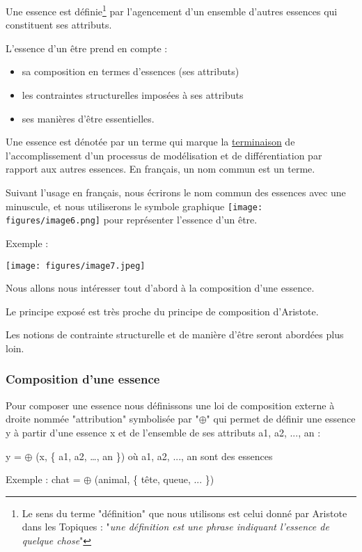 \documentclass[a4paper, 12pt, openright, french]{book}
\begin{document}
Une essence est définie\footnote{Le sens du terme "définition" que nous utilisons est
	celui donné par Aristote dans les Topiques : "\emph{une définition est
		une phrase indiquant l'essence de quelque chose}"} par l'agencement d'un ensemble
d'autres essences qui constituent ses attributs.

L'essence d'un être prend en compte :

\begin{itemize}
\item
  sa composition en termes d'essences (ses attributs)
\item
  les contraintes structurelles imposées à ses attributs
\item
  ses manières d'être essentielles.
\end{itemize}

Une essence est dénotée par un terme qui marque la \uline{terminaison}
de l'accomplissement d'un processus de
modélisation et de différentiation par rapport aux autres essences. En
français, un nom commun est un terme.

Suivant l'usage en français, nous écrirons le nom
commun des essences avec une minuscule, et nous utiliserons le symbole
graphique
\texttt{[image: figures/image6.png]}
pour représenter l'essence d'un être.

Exemple :

\texttt{[image: figures/image7.jpeg]}

Nous allons nous intéresser tout d'abord à la
composition d'une essence.

Le principe exposé est très proche du principe
de composition d'Aristote.

Les notions de contrainte structurelle et de manière
d'être seront abordées plus loin.




\newpage
\raggedbottom
\subsubsection{Composition d'une essence}
Pour composer une essence nous définissons une loi de composition
externe à droite nommée "attribution" symbolisée par "$\oplus$" qui permet de
définir une essence y à partir d'une essence x et de
l'ensemble de ses attributs a1, a2, ..., an :

y = $\oplus$ (x, \{ a1, a2, \ldots, an \}) où a1, a2, ..., an sont des essences

Exemple : chat = $\oplus$ (animal, \{ tête, queue, ... \})
\end{document}
